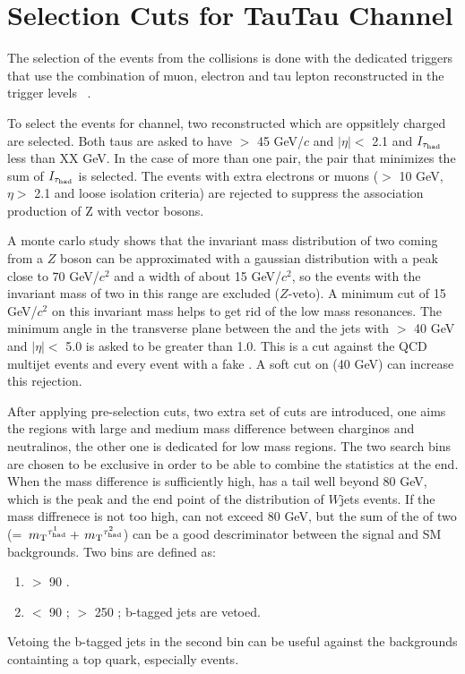 \section{Selection Cuts for TauTau Channel}
\label{sect:tauTauCuts}
The selection of the events from the collisions is done with the dedicated triggers that use the combination of muon, electron 
and tau lepton reconstructed in the trigger levels ~\cite{CMS:2013hoa,Chatrchyan:2012xi,Chatrchyan:2011nv}.

To select the events for \Tau\Tau channel, two reconstructed \Tau which are oppsitlely charged are selected. Both taus are asked to 
have \PT $>$ 45 GeV/$c$ and $|\eta| <$ 2.1 and $I_{\tau_{\rm had}}$ less than XX GeV. In the case of more than one pair, the pair that minimizes the sum of
$I_{\tau_{\rm had}}$ is selected.
The events with extra electrons or muons (\PT $>$ 10 GeV, $\eta >$ 2.1 and loose isolation criteria) 
are rejected to suppress the association production of Z with vector bosons.

A monte carlo study shows that the invariant mass distribution of two \Tau coming from a $Z$ boson can be approximated with a gaussian 
distribution with a peak close to 70 GeV/$c^2$ and a width of about 15 GeV/$c^2$, so the events with the invariant mass of  
two \Tau in this range are excluded ($Z$-veto). A minimum cut of 15 GeV/$c^2$ on this invariant mass helps to get rid of the low mass
resonances. The minimum angle in the transverse plane between the \MET and the jets with \PT $>$ 40 GeV and $|\eta| <$ 5.0 
is asked to be greater than 1.0. This is a cut against the QCD multijet events and every event with a fake \MET. A soft cut on 
\mttwo (40 GeV) can increase this rejection.

After applying pre-selection cuts, two extra set of cuts are introduced, one aims the regions with large and medium mass difference between 
charginos and neutralinos, the other one is dedicated for low mass regions. The two search bins are chosen to be exclusive in order 
to be able to combine the statistics at the end. When the mass difference is sufficiently high, \mttwo has a tail well beyond 80 GeV, which is 
the peak  and the end point of the \mt distribution of $W$jets events. If the mass diffrenece is not too high, \mttwo can not exceed 80 GeV, 
but the sum of the \mt of two \Tau (\SumMT = $\,{m_{\rm T}}^{\tau_{\rm had}^1} + \,{m_{\rm T}}^{\tau_{\rm had}^2}$) can be a good descriminator between the signal and SM backgrounds. 
Two bins are defined as:
\begin{enumerate}
\item \mttwo $>$ 90 \GeV.
\item \mttwo $<$ 90 \GeV; \SumMT $>$ 250 \GeV; b-tagged jets are vetoed.
\end{enumerate}
Vetoing the b-tagged jets in the second bin can be useful against the backgrounds containting a top quark, especially \ttbar events. 


